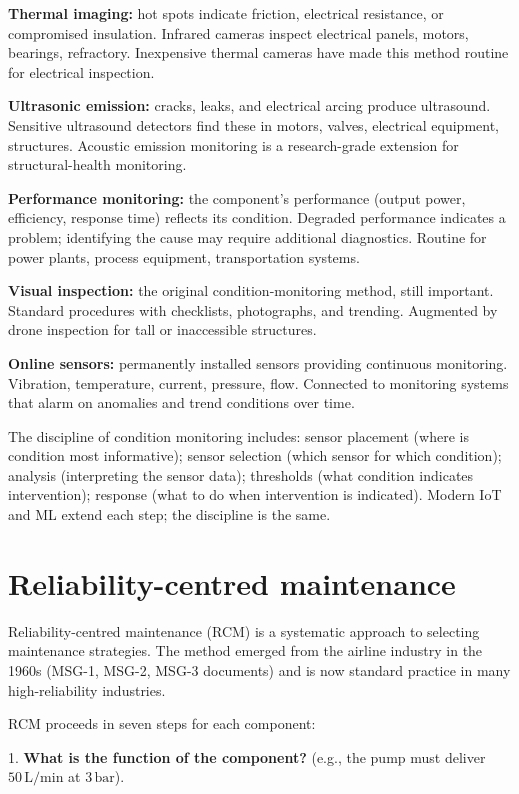 \textbf{Thermal imaging:} hot spots indicate friction, electrical resistance, or compromised insulation. Infrared cameras inspect electrical panels, motors, bearings, refractory. Inexpensive thermal cameras have made this method routine for electrical inspection.

\textbf{Ultrasonic emission:} cracks, leaks, and electrical arcing produce ultrasound. Sensitive ultrasound detectors find these in motors, valves, electrical equipment, structures. Acoustic emission monitoring is a research-grade extension for structural-health monitoring.

\textbf{Performance monitoring:} the component's performance (output power, efficiency, response time) reflects its condition. Degraded performance indicates a problem; identifying the cause may require additional diagnostics. Routine for power plants, process equipment, transportation systems.

\textbf{Visual inspection:} the original condition-monitoring method, still important. Standard procedures with checklists, photographs, and trending. Augmented by drone inspection for tall or inaccessible structures.

\textbf{Online sensors:} permanently installed sensors providing continuous monitoring. Vibration, temperature, current, pressure, flow. Connected to monitoring systems that alarm on anomalies and trend conditions over time.

The discipline of condition monitoring includes: sensor placement (where is condition most informative); sensor selection (which sensor for which condition); analysis (interpreting the sensor data); thresholds (what condition indicates intervention); response (what to do when intervention is indicated). Modern IoT and ML extend each step; the discipline is the same.

\section{Reliability-centred maintenance}

Reliability-centred maintenance (RCM) is a systematic approach to selecting maintenance strategies. The method emerged from the airline industry in the 1960s (MSG-1, MSG-2, MSG-3 documents) and is now standard practice in many high-reliability industries.

RCM proceeds in seven steps for each component:

1. \textbf{What is the function of the component?} (e.g., the pump must deliver $50\,\text{L/min}$ at $3\,\text{bar}$).

